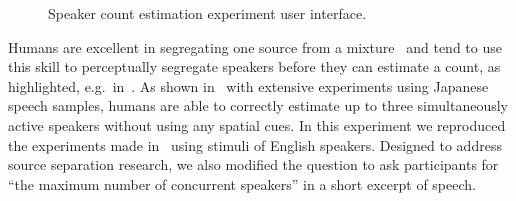 \begin{figure}[htb]
	\centering
	\caption{Speaker count estimation experiment user interface.}
	\label{fig:user_interface_speaker}
\end{figure}

Humans are excellent in segregating one source from a mixture~\cite{bregman} and tend to use this skill to perceptually segregate speakers before they can estimate a count, as highlighted, e.g.\ in~\cite{kawashima15}.
As shown in~\cite{kashino96, kawashima15} with extensive experiments using Japanese speech samples, humans are able to correctly estimate up to three simultaneously active speakers without using any spatial cues.
In this experiment we reproduced the experiments made in~\cite{kawashima15, kashino96} using stimuli of English speakers.
Designed to address source separation research, we also modified the question to ask participants for ``the maximum number of concurrent speakers'' in a short excerpt of speech.

